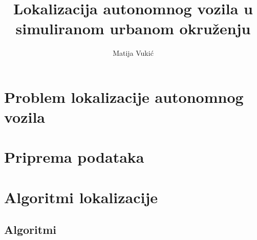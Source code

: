 \documentclass[times, utf8, diplomski]{fer}
\begin{document}

\title{Lokalizacija autonomnog vozila u simuliranom urbanom okruženju}

\author{Matija Vukić}

\maketitle

\izvornik


\tableofcontents


\chapter{Problem lokalizacije autonomnog vozila}



\chapter{Priprema podataka}







\chapter{Algoritmi lokalizacije}



\section{Algoritmi}








\end{document}

